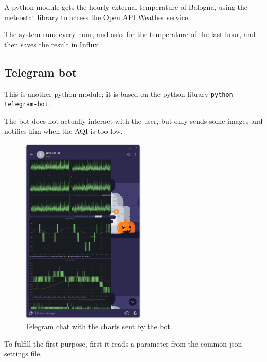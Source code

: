 \documentclass[]{article}
\begin{document}
A python module gets the hourly external temperature of Bologna, using the meteostat library to access the Open API Weather service. 

The system runs every hour, and asks for the temperature of the last hour, and then saves the result in Influx.

\subsection{Telegram bot}\label{teleg_sect}
This is another python module; it is based on the python library \texttt{python-telegram-bot}. 

The bot does not actually interact with the user, but only sends some images and notifies him when the AQI is too low. 

\begin{figure}
	\begin{center}
		\includegraphics[width=6cm]{img/telegram.png}
		\caption{\label{telegram}Telegram chat with the charts sent by the bot.}
	\end{center}
\end{figure}

To fulfill the first purpose, first it reads a parameter from the common json settings file, 
\end{document}
